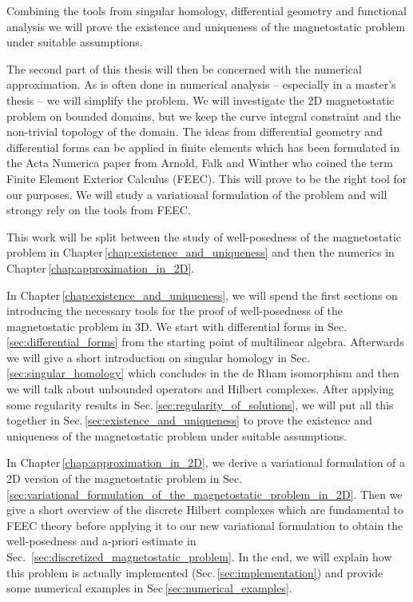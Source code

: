 \documentclass[../master_thesis.tex]{subfiles}
\begin{document}
Combining the tools from singular homology, differential geometry and 
functional analysis we will prove the existence and uniqueness of the magnetostatic problem 
under suitable assumptions.

The second part of this thesis will then be concerned with the numerical approximation. 
As is often done in numerical analysis -- especially in a master's thesis -- we 
will simplify the problem. We will investigate the 2D magnetostatic problem on bounded domains, 
but we keep the curve integral 
constraint and the non-trivial topology of the domain. The ideas from differential geometry and 
differential forms can be applied in finite elements
which has been formulated in the Acta Numerica paper from Arnold, Falk and Winther 
\cite{arnold_falk_winther} who coined the term Finite Element Exterior Calculus (FEEC). This will prove to 
be the right tool for our purposes. We will study a variational formulation of the problem 
and will strongy rely on the tools from FEEC.


This work will be split between the study of well-posedness of the magnetostatic problem 
in Chapter\,\ref{chap:existence_and_uniqueness} and then the numerics in Chapter\,\ref{chap:approximation_in_2D}.

In Chapter\,\ref{chap:existence_and_uniqueness}, we will spend the first sections on 
introducing the necessary tools for the proof of well-posedness of the magnetostatic problem 
in 3D. We start with differential forms in Sec.\,\ref{sec:differential_forms} from the starting point 
of multilinear algebra. Afterwards we will give a short introduction on 
singular homology in Sec.\,\ref{sec:singular_homology} which concludes in the de Rham isomorphism and then 
we will talk about unbounded operators and Hilbert 
complexes. After applying some regularity results in Sec.\,\ref{sec:regularity_of_solutions},
we will put all this together in Sec.\,\ref{sec:existence_and_uniqueness} to prove the existence and uniqueness 
of the magnetostatic problem under suitable assumptions.

In Chapter\,\ref{chap:approximation_in_2D}, we derive a variational formulation of a 2D version of the 
magnetostatic problem in Sec.\,\ref{sec:variational_formulation_of_the_magnetostatic_problem_in_2D}. Then we give a short overview of the discrete Hilbert complexes 
which are fundamental to FEEC theory before applying it to our new variational formulation 
to obtain the well-posedness and a-priori estimate in Sec.~\ref{sec:discretized_magnetostatic_problem}. 
In the end, we will explain how this 
problem is actually implemented (Sec.\,\ref{sec:implementation}) 
and provide some numerical examples in Sec\,\ref{sec:numerical_examples}.
\end{document}
